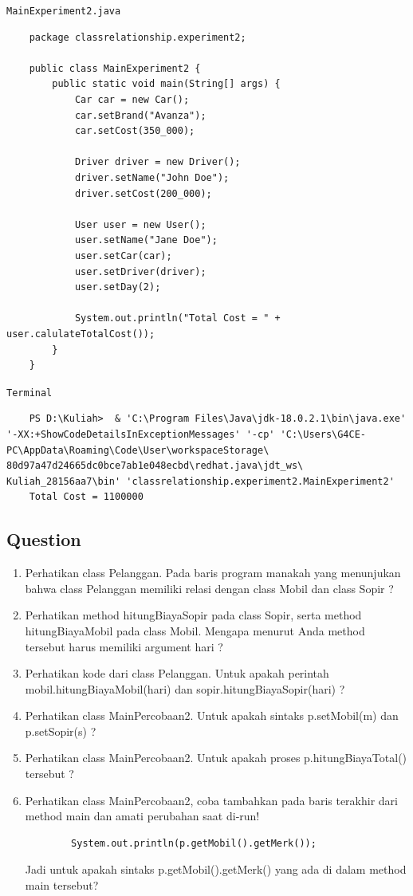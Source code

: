 \documentclass[12pt,titlepage]{article}
\begin{document}
\noindent \texttt{MainExperiment2.java}
\begin{verbatim}
    package classrelationship.experiment2;

    public class MainExperiment2 {
        public static void main(String[] args) {
            Car car = new Car();
            car.setBrand("Avanza");
            car.setCost(350_000);

            Driver driver = new Driver();
            driver.setName("John Doe");
            driver.setCost(200_000);

            User user = new User();
            user.setName("Jane Doe");
            user.setCar(car);
            user.setDriver(driver);
            user.setDay(2);
            
            System.out.println("Total Cost = " + user.calulateTotalCost());
        }
    }
\end{verbatim}

\noindent \texttt{Terminal}
\begin{verbatim}
    PS D:\Kuliah>  & 'C:\Program Files\Java\jdk-18.0.2.1\bin\java.exe' '-XX:+ShowCodeDetailsInExceptionMessages' '-cp' 'C:\Users\G4CE-PC\AppData\Roaming\Code\User\workspaceStorage\ 80d97a47d24665dc0bce7ab1e048ecbd\redhat.java\jdt_ws\ Kuliah_28156aa7\bin' 'classrelationship.experiment2.MainExperiment2'
    Total Cost = 1100000
\end{verbatim}

\newpage
\subsection{Question}
\begin{enumerate}
    \item Perhatikan class Pelanggan. Pada baris program manakah yang menunjukan bahwa class Pelanggan memiliki relasi dengan class Mobil dan class Sopir ?
    \item Perhatikan method hitungBiayaSopir pada class Sopir, serta method\\ hitungBiayaMobil pada class Mobil. Mengapa menurut Anda method tersebut harus memiliki argument hari ?
    \item Perhatikan kode dari class Pelanggan. Untuk apakah perintah\\ mobil.hitungBiayaMobil(hari) dan sopir.hitungBiayaSopir(hari) ?
    \item Perhatikan class MainPercobaan2. Untuk apakah sintaks p.setMobil(m) dan p.setSopir(s) ?
    \item Perhatikan class MainPercobaan2. Untuk apakah proses p.hitungBiayaTotal() tersebut ?
    \item Perhatikan class MainPercobaan2, coba tambahkan pada baris terakhir dari method main dan amati perubahan saat di‑run!
    \begin{verbatim}
        System.out.println(p.getMobil().getMerk());
    \end{verbatim}
    Jadi untuk apakah sintaks p.getMobil().getMerk() yang ada di dalam method main tersebut?
\end{enumerate}
\end{document}

